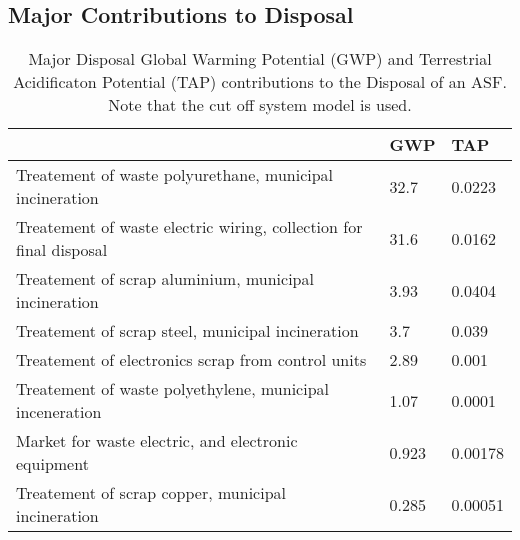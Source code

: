 \subsection{Major Contributions to Disposal}
\begin{table}[H]
\begin{tabular}{lll}

\hline
                                                                   & GWP   & TAP     \\
\hline                                                                
Treatement of waste polyurethane, municipal incineration           & 32.7  & 0.0223  \\
Treatement of waste electric wiring, collection for final disposal & 31.6  & 0.0162  \\
Treatement of scrap aluminium, municipal incineration              & 3.93  & 0.0404  \\
Treatement of scrap steel, municipal incineration                  & 3.7   & 0.039   \\
Treatement of electronics scrap from control units                 & 2.89  & 0.001   \\
Treatement of waste polyethylene, municipal inceneration           & 1.07  & 0.0001  \\
Market for waste electric, and electronic equipment                & 0.923 & 0.00178 \\
Treatement of scrap copper, municipal incineration                 & 0.285 & 0.00051 \\
\hline
\end{tabular}
\caption{Major Disposal Global Warming Potential (GWP) and Terrestrial Acidificaton Potential (TAP) contributions to the Disposal of an ASF. Note that the cut off system model is used.}
\label{tab:dispEmssions}
\end{table}